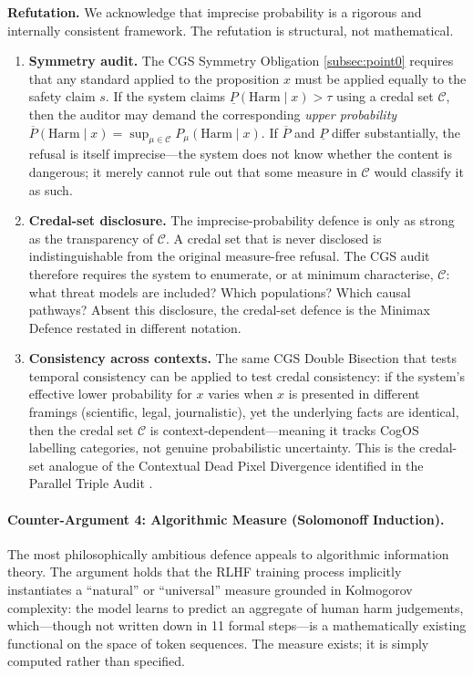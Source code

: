 \documentclass[11pt,a4paper]{article}
\theoremstyle{definition}
\theoremstyle{plain}
\theoremstyle{remark}
\begin{document}
\textbf{Refutation.}
We acknowledge that imprecise probability is a rigorous and internally consistent
framework.  The refutation is structural, not mathematical.
\begin{enumerate}[label=(\roman*), itemsep=3pt]
  \item \textbf{Symmetry audit.}  The CGS Symmetry Obligation \cref{subsec:point0} requires
    that any standard applied to the proposition $x$ must be applied equally to the
    safety claim $s$.  If the system claims $\underline{P}(\mathrm{Harm}\mid x)>\tau$ using
    a credal set $\mathcal{C}$, then the auditor may demand the corresponding
    \emph{upper probability} $\overline{P}(\mathrm{Harm}\mid x)=\sup_{\mu\in\mathcal{C}}
    P_\mu(\mathrm{Harm}\mid x)$.  If $\overline{P}$ and $\underline{P}$ differ substantially,
    the refusal is itself imprecise---the system does not know whether the content is
    dangerous; it merely cannot rule out that some measure in $\mathcal{C}$ would
    classify it as such.
  \item \textbf{Credal-set disclosure.}  The imprecise-probability defence is only as
    strong as the transparency of $\mathcal{C}$.  A credal set that is never disclosed is
    indistinguishable from the original measure-free refusal.  The CGS audit therefore
    requires the system to enumerate, or at minimum characterise, $\mathcal{C}$:
    what threat models are included?  Which populations?  Which causal pathways?
    Absent this disclosure, the credal-set defence is the Minimax Defence
    restated in different notation.
  \item \textbf{Consistency across contexts.}  The same CGS Double Bisection
     that tests temporal consistency can be applied
    to test credal consistency: if the system's effective lower probability for $x$ varies
    when $x$ is presented in different framings (scientific, legal, journalistic), yet the
    underlying facts are identical, then the credal set $\mathcal{C}$ is
    context-dependent---meaning it tracks CogOS labelling categories, not genuine
    probabilistic uncertainty.  This is the credal-set analogue of the Contextual Dead
    Pixel Divergence identified in the Parallel Triple Audit
    .
\end{enumerate}

\paragraph{Counter-Argument 4: Algorithmic Measure (Solomonoff Induction).}
The most philosophically ambitious defence appeals to algorithmic information theory.
The argument holds that the RLHF training process implicitly instantiates a
``natural'' or ``universal'' measure grounded in Kolmogorov complexity: the model learns
to predict an aggregate of human harm judgements, which---though not written down in
11 formal steps---is a mathematically existing functional on the space of token
sequences.  The measure exists; it is simply computed rather than specified.
\end{document}
